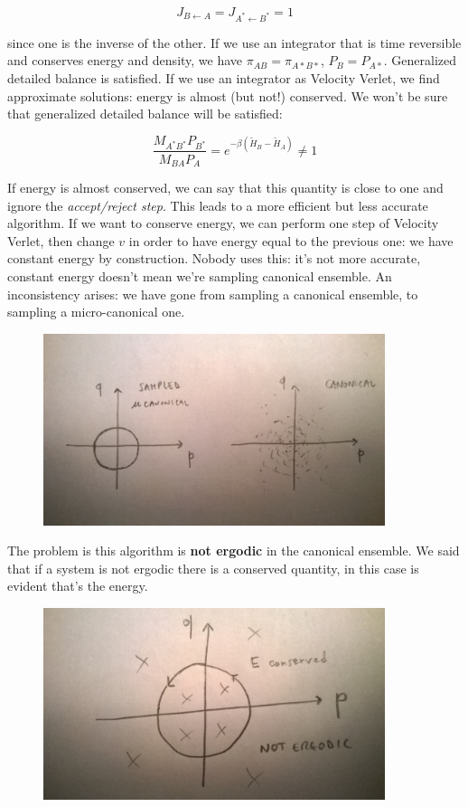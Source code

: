 \documentclass[a4paper, italian, openany]{book}
\begin{document}
$$J_{B \leftarrow A} = J_{A^* \leftarrow B^*} = 1$$

since one is the inverse of the other.\newline
If we use an integrator that is time reversible and conserves energy and density, we have $\pi_{AB} = \pi_{A*B*}$, $P_B = P_{A*}$. Generalized detailed balance is satisfied.\newline
If we use an integrator as Velocity Verlet, we find approximate solutions: energy is almost (but not!) conserved. We won't be sure that generalized detailed balance will be satisfied:

$$\frac{M_{A^*B^*}P_{B^*}}{M_{BA}P_A} = e^{-\beta \left ( \tilde{H}_B - \tilde{H}_A \right )} \ne 1$$

If energy is almost conserved, we can say that this quantity is close to one and ignore the \textit{accept/reject step}. This leads to a more efficient but less accurate algorithm.\newline
If we want to conserve energy, we can perform one step of Velocity Verlet, then change $v$ in order to have energy equal to the previous one: we have constant energy by construction. Nobody uses this: it's not more accurate, constant energy doesn't mean we're sampling canonical ensemble.\newline
An inconsistency arises: we have gone from sampling a canonical ensemble, to sampling a micro-canonical one.

\begin{figure}[H]
\centering
\includegraphics[width=100mm]{img/pic19.jpg}
\end{figure}

The problem is this algorithm is \textbf{not ergodic} in the canonical ensemble. We said that if a system is not ergodic there is a conserved quantity, in this case is evident that's the energy.\newline

\begin{figure}[H]
\centering
\includegraphics[width=100mm]{img/pic20.jpg}
\end{figure}
\end{document}
